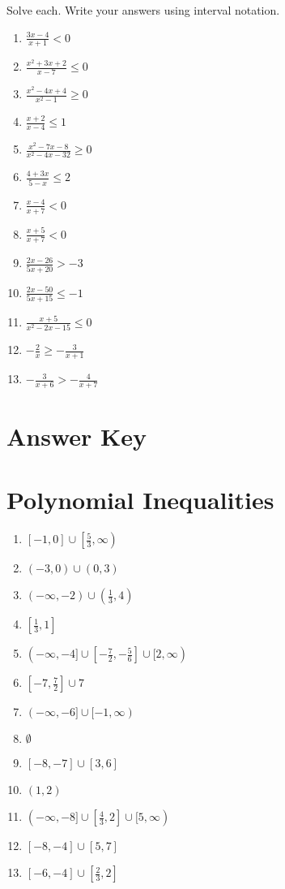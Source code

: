 Solve each. Write your answers using interval notation.
\begin{multicols}{3}
\begin{enumerate}
\setlength\itemsep{10pt}
\item $\frac{3x-4}{x+1}<0$
\item $\frac{x^2+3x+2}{x-7} \leq 0$
\item $\frac{x^2-4x+4}{x^2-1} \geq 0$
\item $\frac{x+2}{x-4} \leq 1$
\item $\frac{x^2-7x-8}{x^2-4x-32} \geq 0$
\item $\frac{4+3x}{5-x} \leq 2$
\item $\frac{x-4}{x+7} < 0$
\item $\frac{x+5}{x+7} < 0$
\item $\frac{2x-26}{5x+20} > -3$
\item $\frac{2x-50}{5x+15} \leq -1$
\item $\frac{x+5}{x^2-2x-15} \leq 0$
\item $-\frac{2}{x} \geq - \frac{3}{x+1}$
\item $-\frac{3}{x+6} > -\frac{4}{x+7}$
\end{enumerate}
\end{multicols}

\newpage

\section{Answer Key}

\section*{Polynomial Inequalities}
\begin{multicols}{2}
\begin{enumerate}
    \item $[-1,0] \cup \left[\frac{5}{3}, \infty\right)$
    \item $(-3,0) \cup (0,3)$
    \item $(-\infty, -2) \cup \left(\frac{1}{3}, 4\right)$
    \item $\left[\frac{1}{3}, 1\right]$
    \item $(-\infty, -4] \cup \left[-\frac{7}{2},-\frac{5}{6}\right] \cup [2, \infty)$
    \item $\left[-7, \frac{7}{2}\right] \cup {7}$
    \item $(-\infty, -6] \cup [-1, \infty)$
    \item $\emptyset$
    \item $[-8,-7] \cup [3, 6]$
    \item $(1,2)$
    \item $(-\infty, -8] \cup \left[\frac{4}{3}, 2\right] \cup [5, \infty)$
    \item $[-8, -4] \cup [5, 7]$
    \item $[-6, -4] \cup \left[\frac{2}{3}, 2\right]$
\end{enumerate}
\end{multicols}


